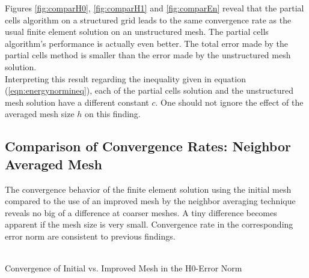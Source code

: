 \documentclass[a4paper,12pt]{article}
\makeatletter
\newenvironment{figurehere}
  {\def\@captype{figure}}
  {}
\makeatother
\begin{document}
Figures \ref{fig:comparH0}, \ref{fig:comparH1} and \ref{fig:comparEn} reveal that the partial cells algorithm on a structured grid leads to the same convergence rate as the usual finite element solution on an unstructured mesh. The partial cells algorithm's performance is actually even better. The total error made by the partial cells method is smaller than the error made by the unstructured mesh solution. \\
Interpreting this result regarding the inequality given in equation (\ref{eqn:energynormineq}), each of the partial cells solution and the unstructured mesh solution have a different constant $c$. One should not ignore the effect of the averaged mesh size $h$ on this finding. 
\subsection{Comparison of Convergence Rates: Neighbor Averaged Mesh}
The convergence behavior of the finite element solution using the initial mesh compared to the use of an improved mesh by the neighbor averaging technique reveals no big of a difference at coarser meshes. A tiny difference becomes apparent if the mesh size is very small. Convergence rate in the corresponding error norm are consistent to previous findings.
\begin{center}
\begin{figurehere}
\\
\caption{Convergence of Initial vs. Improved Mesh in the H$0$-Error Norm}\label{fig:comparH0impr}
\end{figurehere}
\end{center}
\end{document}
